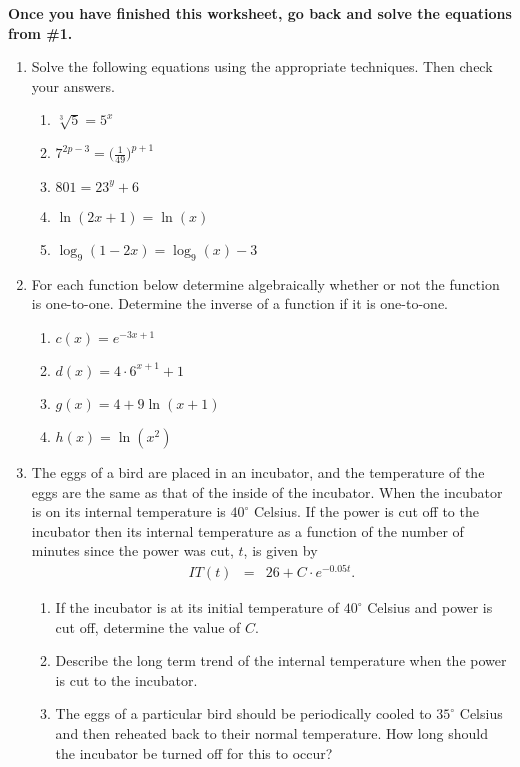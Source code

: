 \noindent \textbf{Once you have finished this worksheet, go back and
  solve the equations from \#1.}



\begin{enumerate}
\item Solve the following equations using the appropriate techniques.
  Then check your answers.
  \begin{enumerate}
  \item $\sqrt[3]{5}=5^x$
  \item $\displaystyle 7^{2p-3}=\Big(\frac{1}{49}\Big)^{p+1}$
  \item $801=23^y+6$
  \item $\ln(2x+1) = \ln(x)$
  \item $\log_9(1-2x) = \log_9(x) - 3$
  \end{enumerate}
\item For each function below determine algebraically whether or not
  the function is one-to-one. Determine the inverse of a function if
  it is one-to-one.
  \begin{enumerate}
  \item ${\displaystyle c(x) = e^{-3x+1}}$
  \item ${\displaystyle d(x) = 4\cdot 6^{x+1} + 1}$
  \item ${\displaystyle g(x) = 4 + 9\ln\left(x+1\right)}$
  \item ${\displaystyle h(x) = \ln\left(x^2\right)}$
  \end{enumerate}
    
\item The eggs of a bird are placed in an incubator, and the
  temperature of the eggs are the same as that of the inside of the
  incubator. When the incubator is on its internal temperature is
  $40^\circ$ Celsius. If the power is cut off to the incubator then
  its internal temperature as a function of the number of minutes
  since the power was cut, $t$, is given by
  \begin{eqnarray*}
    IT(t) & = & 26+C\cdot e^{-0.05t}.
  \end{eqnarray*}

  \begin{enumerate}
  \item If the incubator is at its initial temperature of $40^\circ$
    Celsius and power is cut off, determine the value of $C$.
  \item Describe the long term trend of the internal temperature when
    the power is cut to the incubator.
  \item The eggs of a particular bird should be periodically cooled to
    $35^\circ$ Celsius and then reheated back to their normal
    temperature. How long should the incubator be turned off for this
    to occur?
  \end{enumerate}


\end{enumerate}
